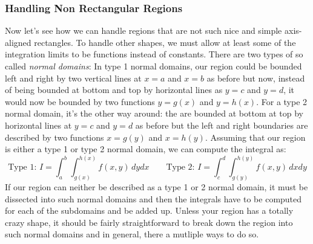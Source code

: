 \subsubsection{Handling Non Rectangular Regions}
Now let's see how we can handle regions that are not such nice and simple axis-aligned rectangles. To handle other shapes, we must allow at least some of the integration limits to be functions instead of constants. There are two types of so called \emph{normal domains}: In type 1 normal domains, our region could be bounded left and right by two vertical lines at $x = a$ and $x = b$ as before but now, instead of being bounded at bottom and top by horizontal lines as $y = c$ and $y = d$, it would now be bounded by two functions $y = g(x)$ and $y = h(x)$. For a type 2 normal domain, it's the other way around: the are bounded at bottom at top by horizontal lines at $y = c$ and $y = d$  as before but the left and right boundaries are described by two functions $x = g(y)$ and $x = h(y)$. Assuming that our region is either a type 1 or type 2 normal domain, we can compute the integral as:
\begin{equation}
\text{Type 1: } I = \int_a^b \int_{g(x)}^{h(x)} f(x,y) \, dy dx   \qquad
\text{Type 2: } I = \int_c^d \int_{g(y)}^{h(y)} f(x,y) \, dx dy
\end{equation}
If our region can neither be described as a type 1 or 2 normal domain, it must be dissected into such normal domains and then the integrals have to be computed for each of the subdomains and be added up. Unless your region has a totally crazy shape, it should be fairly straightforward to break down the region into such normal domains and in general, there a mutliple ways to do so. 


